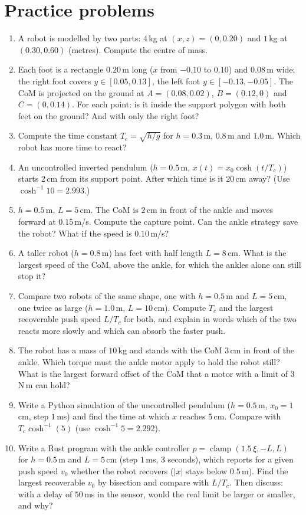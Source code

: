 \section*{Practice problems}
\begin{enumerate}[label=\textbf{\thechapter.\arabic*}]
  \item A robot is modelled by two parts: $4$\,kg at $(x,z)=(0,0.20)$ and $1$\,kg at $(0.30,0.60)$ (metres). Compute the centre of mass.
  \item Each foot is a rectangle $0.20$\,m long ($x$ from $-0.10$ to $0.10$) and $0.08$\,m wide; the right foot covers $y\in[0.05,0.13]$, the left foot $y\in[-0.13,-0.05]$. The CoM is projected on the ground at $A=(0.08,0.02)$, $B=(0.12,0)$ and $C=(0,0.14)$. For each point: is it inside the support polygon with both feet on the ground? And with only the right foot?
  \item Compute the time constant $T_c=\sqrt{h/g}$ for $h=0.3$\,m, $0.8$\,m and $1.0$\,m. Which robot has more time to react?
  \item An uncontrolled inverted pendulum ($h=0.5$\,m, $x(t)=x_0\cosh(t/T_c)$) starts $2$\,cm from its support point. After which time is it $20$\,cm away? (Use $\cosh^{-1}10=2.993$.)
  \item $h=0.5$\,m, $L=5$\,cm. The CoM is $2$\,cm in front of the ankle and moves forward at $0.15$\,m/s. Compute the capture point. Can the ankle strategy save the robot? What if the speed is $0.10$\,m/s?
  \item A taller robot ($h=0.8$\,m) has feet with half length $L=8$\,cm. What is the largest speed of the CoM, above the ankle, for which the ankles alone can still stop it?
  \item Compare two robots of the same shape, one with $h=0.5$\,m and $L=5$\,cm, one twice as large ($h=1.0$\,m, $L=10$\,cm). Compute $T_c$ and the largest recoverable push speed $L/T_c$ for both, and explain in words which of the two reacts more slowly and which can absorb the faster push.
  \item The robot has a mass of $10$\,kg and stands with the CoM $3$\,cm in front of the ankle. Which torque must the ankle motor apply to hold the robot still? What is the largest forward offset of the CoM that a motor with a limit of $3$\,N\,m can hold?
  \item Write a Python simulation of the uncontrolled pendulum ($h=0.5$\,m, $x_0=1$\,cm, step $1$\,ms) and find the time at which $x$ reaches $5$\,cm. Compare with $T_c\cosh^{-1}(5)$ (use $\cosh^{-1}5=2.292$).
  \item[\textbf{\thechapter.10}$\star$] Write a Rust program with the ankle controller $p=\operatorname{clamp}(1.5\,\xi,-L,L)$ for $h=0.5$\,m and $L=5$\,cm (step $1$\,ms, $3$ seconds), which reports for a given push speed $v_0$ whether the robot recovers ($|x|$ stays below $0.5$\,m). Find the largest recoverable $v_0$ by bisection and compare with $L/T_c$. Then discuss: with a delay of $50$\,ms in the sensor, would the real limit be larger or smaller, and why?
\end{enumerate}
